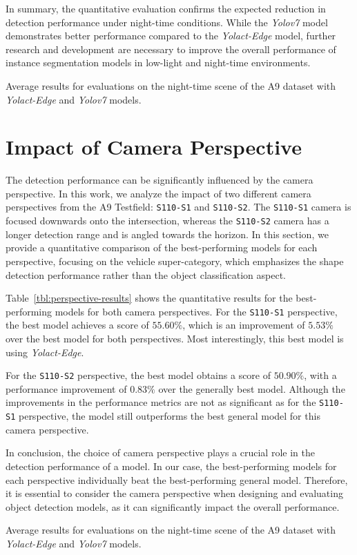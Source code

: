 In summary, the quantitative evaluation confirms the expected reduction in detection performance under night-time conditions.
While the \textit{Yolov7} model demonstrates better performance compared to the \textit{Yolact-Edge} model, further research and development are necessary to improve the overall performance of instance segmentation models in low-light and night-time environments.

\begin{table}[htb]
    
    \caption{Average results for evaluations on the night-time scene of the A9 dataset with \textit{Yolact-Edge} and \textit{Yolov7} models.}
    \label{tbl:nighttime-results}
\end{table}

\section{Impact of Camera Perspective}
\label{sec:perspective}

The detection performance can be significantly influenced by the camera perspective.
In this work, we analyze the impact of two different camera perspectives from the A9 Testfield: \texttt{S110-S1} and \texttt{S110-S2}. The \texttt{S110-S1} camera is focused downwards onto the intersection, whereas the \texttt{S110-S2} camera has a longer detection range and is angled towards the horizon.
In this section, we provide a quantitative comparison of the best-performing models for each perspective, focusing on the vehicle super-category, which emphasizes the shape detection performance rather than the object classification aspect.

Table~\ref{tbl:perspective-results} shows the quantitative results for the best-performing models for both camera perspectives. For the \texttt{S110-S1} perspective, the best model achieves a score of $55.60\%$, which is an improvement of $5.53\%$ over the best model for both perspectives.
Most interestingly, this best model is using \textit{Yolact-Edge}.

For the \texttt{S110-S2} perspective, the best model obtains a score of $50.90\%$, with a performance improvement of $0.83\%$ over the generally best model.
Although the improvements in the performance metrics are not as significant as for the \texttt{S110-S1} perspective, the model still outperforms the best general model for this camera perspective.

In conclusion, the choice of camera perspective plays a crucial role in the detection performance of a model.
In our case, the best-performing models for each perspective individually beat the best-performing general model.
Therefore, it is essential to consider the camera perspective when designing and evaluating object detection models, as it can significantly impact the overall performance.

\begin{table}[htb]
    
    \caption{Average results for evaluations on the night-time scene of the A9 dataset with \textit{Yolact-Edge} and \textit{Yolov7} models.}
    \label{tbl:perspective-results}
\end{table}

